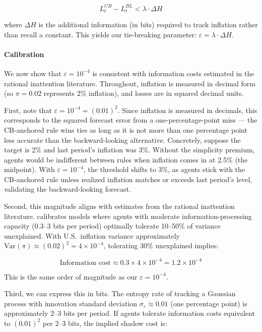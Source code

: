 \documentclass[10pt]{article}
\begin{document}
\begin{equation}
L^{CB}_t - L^{BL}_t < \lambda \cdot \Delta H
\end{equation}

where $\Delta H$ is the additional information (in bits) required to track inflation rather than recall a constant. This yields our tie-breaking parameter: $\varepsilon = \lambda \cdot \Delta H$.

\paragraph{Calibration} We now show that $\varepsilon = 10^{-4}$ is consistent with information costs estimated in the rational inattention literature. Throughout, inflation is measured in decimal form (so $\pi = 0.02$ represents 2\% inflation), and losses are in squared decimal units.

First, note that $\varepsilon = 10^{-4} = (0.01)^2$. Since inflation is measured in decimals, this corresponds to the squared forecast error from a one-percentage-point miss --- the CB-anchored rule wins ties as long as it is not more than one percentage point less accurate than the backward-looking alternative. Concretely, suppose the target is 2\% and last period's inflation was 3\%. Without the simplicity premium, agents would be indifferent between rules when inflation comes in at 2.5\% (the midpoint). With $\varepsilon = 10^{-4}$, the threshold shifts to 3\%, as agents stick with the CB-anchored rule unless realized inflation matches or exceeds last period's level, validating the backward-looking forecast.

Second, this magnitude aligns with estimates from the rational inattention literature. \citet{sims2003implications} calibrates models where agents with moderate information-processing capacity (0.3--3 bits per period) optimally tolerate 10--50\% of variance unexplained. With U.S.\ inflation variance approximately $\text{Var}(\pi) \approx (0.02)^2 = 4 \times 10^{-4}$, tolerating 30\% unexplained implies:

\begin{equation}
\text{Information cost} \approx 0.3 \times 4 \times 10^{-4} = 1.2 \times 10^{-4}
\end{equation}

This is the same order of magnitude as our $\varepsilon = 10^{-4}$.

Third, we can express this in bits. The entropy rate of tracking a Gaussian process with innovation standard deviation $\sigma_\varepsilon \approx 0.01$ (one percentage point) is approximately 2--3 bits per period. If agents tolerate information costs equivalent to $(0.01)^2$ per 2--3 bits, the implied shadow cost is:
\end{document}
